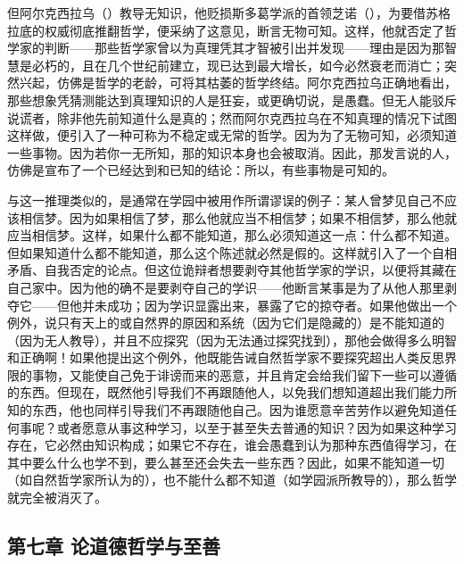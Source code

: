 但阿尔克西拉乌（）教导无知识，他贬损斯多葛学派的首领芝诺（），为要借苏格拉底的权威彻底推翻哲学，便采纳了这意见，断言无物可知。这样，他就否定了哲学家的判断——那些哲学家曾以为真理凭其才智被引出并发现——理由是因为那智慧是必朽的，且在几个世纪前建立，现已达到最大增长，如今必然衰老而消亡；突然兴起，仿佛是哲学的老龄，可将其枯萎的哲学终结。阿尔克西拉乌正确地看出，那些想象凭猜测能达到真理知识的人是狂妄，或更确切说，是愚蠢。但无人能驳斥说谎者，除非他先前知道什么是真的；然而阿尔克西拉乌在不知真理的情况下试图这样做，便引入了一种可称为不稳定或无常的哲学。因为为了无物可知，必须知道一些事物。因为若你一无所知，那的知识本身也会被取消。因此，那发言说的人，仿佛是宣布了一个已经达到和已知的结论：所以，有些事物是可知的。\par

与这一推理类似的，是通常在学园中被用作所谓谬误的例子：某人曾梦见自己不应该相信梦。因为如果相信了梦，那么他就应当不相信梦；如果不相信梦，那么他就应当相信梦。这样，如果什么都不能知道，那么必须知道这一点：什么都不知道。但如果知道什么都不能知道，那么这个陈述就必然是假的。这样就引入了一个自相矛盾、自我否定的论点。但这位诡辩者想要剥夺其他哲学家的学识，以便将其藏在自己家中。因为他的确不是要剥夺自己的学识——他断言某事是为了从他人那里剥夺它——但他并未成功；因为学识显露出来，暴露了它的掠夺者。如果他做出一个例外，说只有天上的或自然界的原因和系统（因为它们是隐藏的）是不能知道的（因为无人教导），并且不应探究（因为无法通过探究找到），那他会做得多么明智和正确啊！如果他提出这个例外，他既能告诫自然哲学家不要探究超出人类反思界限的事物，又能使自己免于诽谤而来的恶意，并且肯定会给我们留下一些可以遵循的东西。但现在，既然他引导我们不再跟随他人，以免我们想知道超出我们能力所知的东西，他也同样引导我们不再跟随他自己。因为谁愿意辛苦劳作以避免知道任何事呢？或者愿意从事这种学习，以至于甚至失去普通的知识？因为如果这种学习存在，它必然由知识构成；如果它不存在，谁会愚蠢到认为那种东西值得学习，在其中要么什么也学不到，要么甚至还会失去一些东西？因此，如果不能知道一切（如自然哲学家所认为的），也不能什么都不知道（如学园派所教导的），那么哲学就完全被消灭了。\par


\subsection{第七章 论道德哲学与至善}

